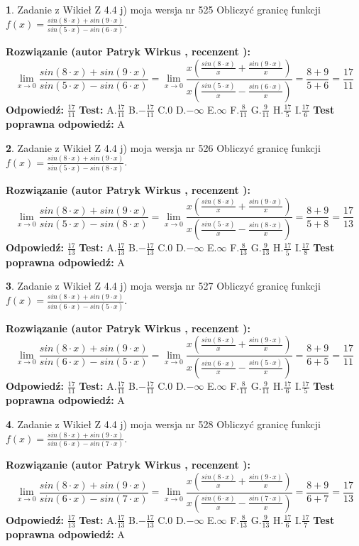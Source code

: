 \documentclass[12pt, a4paper]{article}
\theoremstyle{definition} %
\newtheorem{zad}{}
\newcommand{\zadStart}[1]{\begin{zad}#1\newline}
\newcommand{\zadStop}{\end{zad}}
\newcommand{\rozwStart}[2]{\noindent \textbf{Rozwiązanie (autor #1 , recenzent #2): }\newline}
\newcommand{\rozwStop}{\newline}
\newcommand{\odpStart}{\noindent \textbf{Odpowiedź:}\newline}
\newcommand{\odpStop}{\newline}
\newcommand{\testStart}{\noindent \textbf{Test:}\newline}
\newcommand{\testStop}{\newline}
\newcommand{\kluczStart}{\noindent \textbf{Test poprawna odpowiedź:}\newline}
\newcommand{\kluczStop}{\newline}
\begin{document}
\zadStart{Zadanie z Wikieł Z 4.4 j) moja wersja nr 525}
Obliczyć granicę funkcji $f(x)=\frac{sin(8\cdot x) +sin(9\cdot x)}{sin(5\cdot x) -sin(6\cdot x)}$.
\zadStop
\rozwStart{Patryk Wirkus}{}
$$\lim\limits_{x\to 0}\frac{sin(8\cdot x) +sin(9\cdot x)}{sin(5\cdot x) -sin(6\cdot x)}=\lim\limits_{x\to 0}\frac{x(\frac{sin(8\cdot x)}{x}+\frac{sin(9\cdot x)}{x})}{x(\frac{sin(5\cdot x)}{x}-\frac{sin(6\cdot x)}{x})}=\frac{8+9}{5+6} = \frac{17}{11}$$
\rozwStop
\odpStart
$\frac{17}{11}$
\odpStop
\testStart
A.$\frac{17}{11}$
B.$-\frac{17}{11}$
C.$0$
D.$-\infty$
E.$\infty$
F.$\frac{8}{11}$
G.$\frac{9}{11}$
H.$\frac{17}{5}$
I.$\frac{17}{6}$
\testStop
\kluczStart
A
\kluczStop



\zadStart{Zadanie z Wikieł Z 4.4 j) moja wersja nr 526}
Obliczyć granicę funkcji $f(x)=\frac{sin(8\cdot x) +sin(9\cdot x)}{sin(5\cdot x) -sin(8\cdot x)}$.
\zadStop
\rozwStart{Patryk Wirkus}{}
$$\lim\limits_{x\to 0}\frac{sin(8\cdot x) +sin(9\cdot x)}{sin(5\cdot x) -sin(8\cdot x)}=\lim\limits_{x\to 0}\frac{x(\frac{sin(8\cdot x)}{x}+\frac{sin(9\cdot x)}{x})}{x(\frac{sin(5\cdot x)}{x}-\frac{sin(8\cdot x)}{x})}=\frac{8+9}{5+8} = \frac{17}{13}$$
\rozwStop
\odpStart
$\frac{17}{13}$
\odpStop
\testStart
A.$\frac{17}{13}$
B.$-\frac{17}{13}$
C.$0$
D.$-\infty$
E.$\infty$
F.$\frac{8}{13}$
G.$\frac{9}{13}$
H.$\frac{17}{5}$
I.$\frac{17}{8}$
\testStop
\kluczStart
A
\kluczStop



\zadStart{Zadanie z Wikieł Z 4.4 j) moja wersja nr 527}
Obliczyć granicę funkcji $f(x)=\frac{sin(8\cdot x) +sin(9\cdot x)}{sin(6\cdot x) -sin(5\cdot x)}$.
\zadStop
\rozwStart{Patryk Wirkus}{}
$$\lim\limits_{x\to 0}\frac{sin(8\cdot x) +sin(9\cdot x)}{sin(6\cdot x) -sin(5\cdot x)}=\lim\limits_{x\to 0}\frac{x(\frac{sin(8\cdot x)}{x}+\frac{sin(9\cdot x)}{x})}{x(\frac{sin(6\cdot x)}{x}-\frac{sin(5\cdot x)}{x})}=\frac{8+9}{6+5} = \frac{17}{11}$$
\rozwStop
\odpStart
$\frac{17}{11}$
\odpStop
\testStart
A.$\frac{17}{11}$
B.$-\frac{17}{11}$
C.$0$
D.$-\infty$
E.$\infty$
F.$\frac{8}{11}$
G.$\frac{9}{11}$
H.$\frac{17}{6}$
I.$\frac{17}{5}$
\testStop
\kluczStart
A
\kluczStop



\zadStart{Zadanie z Wikieł Z 4.4 j) moja wersja nr 528}
Obliczyć granicę funkcji $f(x)=\frac{sin(8\cdot x) +sin(9\cdot x)}{sin(6\cdot x) -sin(7\cdot x)}$.
\zadStop
\rozwStart{Patryk Wirkus}{}
$$\lim\limits_{x\to 0}\frac{sin(8\cdot x) +sin(9\cdot x)}{sin(6\cdot x) -sin(7\cdot x)}=\lim\limits_{x\to 0}\frac{x(\frac{sin(8\cdot x)}{x}+\frac{sin(9\cdot x)}{x})}{x(\frac{sin(6\cdot x)}{x}-\frac{sin(7\cdot x)}{x})}=\frac{8+9}{6+7} = \frac{17}{13}$$
\rozwStop
\odpStart
$\frac{17}{13}$
\odpStop
\testStart
A.$\frac{17}{13}$
B.$-\frac{17}{13}$
C.$0$
D.$-\infty$
E.$\infty$
F.$\frac{8}{13}$
G.$\frac{9}{13}$
H.$\frac{17}{6}$
I.$\frac{17}{7}$
\testStop
\kluczStart
A
\kluczStop
\end{document}
